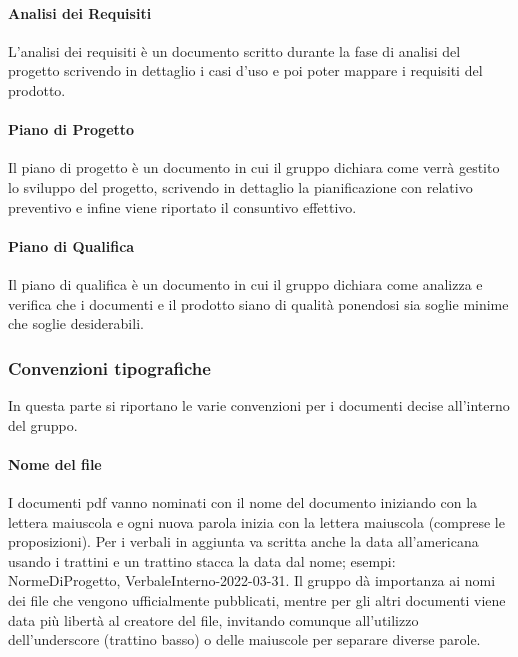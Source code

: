 \paragraph{Analisi dei Requisiti}  \hfill \break
L'analisi dei requisiti è un documento scritto durante la fase di analisi del progetto scrivendo in 
dettaglio i casi d'uso e poi poter mappare i requisiti del prodotto.

\paragraph{Piano di Progetto}  \hfill \break
Il piano di progetto è un documento in cui il gruppo dichiara come verrà gestito lo sviluppo del progetto,
scrivendo in dettaglio la pianificazione con relativo preventivo e infine viene riportato il consuntivo effettivo.

\paragraph{Piano di Qualifica} \hfill \break
Il piano di qualifica è un documento in cui il gruppo dichiara come analizza e verifica che i documenti e 
il prodotto siano di qualità ponendosi sia soglie minime che soglie desiderabili.

\subsubsection{Convenzioni tipografiche} 
In questa parte si riportano le varie convenzioni per i documenti decise all'interno del gruppo.
\paragraph{Nome del file}  \hfill \break
I documenti pdf vanno nominati con il nome del documento iniziando con la lettera maiuscola 
e ogni nuova parola inizia con la lettera maiuscola (comprese le proposizioni). Per i verbali in 
aggiunta va scritta anche la data all'americana usando i trattini e un trattino stacca la data 
dal nome; esempi: NormeDiProgetto, VerbaleInterno-2022-03-31. \newline
Il gruppo dà importanza ai nomi dei file che vengono ufficialmente pubblicati, mentre per gli altri documenti viene data più libertà al creatore del file, invitando comunque 
all'utilizzo dell'underscore (trattino basso) o delle maiuscole per separare diverse parole.


